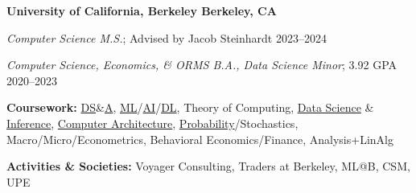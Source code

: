 \textbf{University of California, Berkeley \hfill Berkeley, CA} \par
\textit{Computer Science M.S.}; Advised by Jacob Steinhardt \hfill 2023--2024 \par
\textit{Computer Science, Economics, \& ORMS B.A., Data Science Minor}; 3.92 GPA \hfill 2020--2023\par
\textbf{Coursework:} \href{https://sp23.datastructur.es/}{DS}\&\href{https://cs170.org/}{A}, \href{https://www.eecs189.org/}{ML}/\href{https://inst.eecs.berkeley.edu/~cs188/fa22/}{AI}/\href{https://inst.eecs.berkeley.edu/~cs182/sp23/}{DL}, Theory of Computing, \href{https://ds100.org/}{Data Science} \& \href{https://data102.org/fa22/}{Inference}, \href{https://inst.eecs.berkeley.edu/~cs61c/fa22/}{Computer Architecture}, \href{https://www.stat134.org/}{Probability}/Stochastics, Macro/Micro/Econometrics, Behavioral Economics/Finance, Analysis+LinAlg \par
\textbf{Activities \& Societies:} Voyager Consulting, Traders at Berkeley, ML@B, CSM, UPE